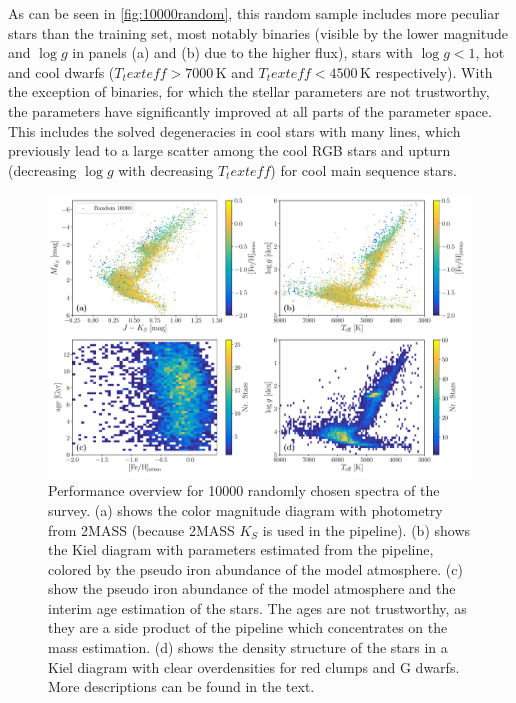 \documentclass[a4paper,11pt,english]{article}
\begin{document}
As can be seen in \autoref{fig:10000random}, this random sample includes more peculiar stars than the training set, most notably binaries (visible by the lower magnitude and $\log g$ in panels (a) and (b) due to the higher flux), stars with $\log g < 1$, hot and cool dwarfs ($T_text{eff} > 7000\,\mathrm{K}$ and $T_text{eff} < 4500\,\mathrm{K}$ respectively). With the exception of binaries, for which the stellar parameters are not trustworthy, the parameters have significantly improved at all parts of the parameter space. This includes the solved degeneracies in cool stars with many lines, which previously lead to a large scatter among the cool RGB stars and upturn (decreasing $\log g$ with decreasing $T_text{eff}$) for cool main sequence stars.

\begin{figure}[!ht]
\centering
\includegraphics[width=\textwidth]{../../random10000/figures/random10000_cmdhrd.pdf}
\caption{Performance overview for 10000 randomly chosen spectra of the survey. (a) shows the color magnitude diagram with photometry from 2MASS (because 2MASS $K_S$ is used in the pipeline). (b) shows the Kiel diagram with parameters estimated from the pipeline, colored by the pseudo iron abundance of the model atmosphere. (c) show the pseudo iron abundance of the model atmosphere and the interim age estimation of the stars. The ages are not trustworthy, as they are a side product of the pipeline which concentrates on the mass estimation. (d) shows the density structure of the stars in a Kiel diagram with clear overdensities for red clumps and G dwarfs. More descriptions can be found in the text.}
\label{fig:10000random}
\end{figure}
\end{document}
